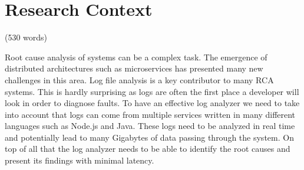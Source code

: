 \begin{abstract}

(200 words)

Microservices are currently the hot new technology for the web, they allow us to break up our otherwise monolithic architecture into much smaller more focused services. This has a lot of benefits, such as reducing system size and increasing release frequency and agility. 

Microservices are not without their flaws. For example, When a particular microservice crashes it can be difficult and time-consuming to find the root cause. Typically a developer would start their analysis by checking the logs of the failed service. This can be a lengthy process and potentially lead to misdiagnoses. The reason is that the developer is not seeing the full picture. For example, the failure on service A could be a direct result of a problem that originated on service B. It is also possible that the root cause could be concealing itself in some convoluted log message that a typical developer could misinterpret. Due to the nature of microservices encouraging continuous deployment it is also possible that a crash was as a direct result of a service deployment at a particular point in time. 

This paper will focus mainly on root cause analysis of microservices deployed to a popular PaaS called Pivotal Cloud Foundry.

\end{abstract}

\chapter{Research Context}

(530 words)

Root cause analysis of systems can be a complex task. The emergence of distributed architectures such as microservices has presented many new challenges in this area. Log file analysis is a key contributor to many RCA systems. This is hardly surprising as logs are often the first place a developer will look in order to diagnose faults. To have an effective log analyzer we need to take into account that logs can come from multiple services written in many different languages such as Node.js and Java. These logs need to be analyzed in real time and potentially lead to many Gigabytes of data passing through the system. On top of all that the log analyzer needs to be able to identify the root causes and present its findings with minimal latency. 


